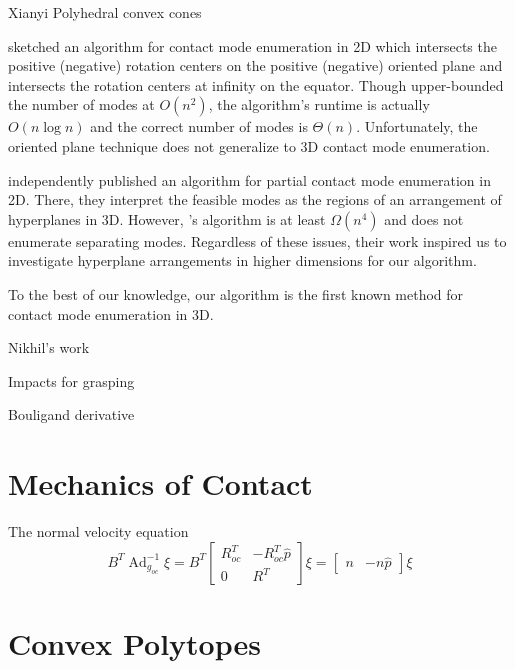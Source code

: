 \documentclass[conference]{IEEEtran}
\DeclareMathOperator{\adjoint}{Ad}
\newcommand{\TODO}[1]{{\color{red} {{#1}}  }}
\begin{document}
\begin{inparaenum}
    \item \TODO{Xianyi} Polyhedral convex cones
    \item \citet{mason_mechanics_2001} sketched an algorithm for contact mode
    enumeration in 2D which intersects the positive (negative) rotation centers
    on the positive (negative) oriented plane and intersects the rotation
    centers at infinity on the equator. Though \citet{mason_mechanics_2001}
    upper-bounded the number of modes at $O(n^2)$, the algorithm's runtime is
    actually $O(n\log n)$ and the correct number of modes is $\Theta(n)$.
    Unfortunately, the oriented plane technique does not generalize to 3D
    contact mode enumeration.
    \item \citet{haas-heger_passive_2018} independently published an algorithm
    for partial contact mode enumeration in 2D. There, they interpret the
    feasible modes as the regions of an arrangement of hyperplanes in 3D.
    However, \citet{haas-heger_passive_2018}'s algorithm is at least
    $\Omega(n^4)$ and does not enumerate separating modes. Regardless of these
    issues, their work inspired us to investigate hyperplane arrangements in
    higher dimensions for our algorithm.
    \item To the best of our knowledge, our algorithm is the first known method
    for contact mode enumeration in 3D.
    \item Nikhil's work
    \item Impacts for grasping
    \item Bouligand derivative
\end{inparaenum}

\section{Mechanics of Contact}

\TODO{}

The normal velocity equation
\begin{equation}
B^T\adjoint_{g_{oc}}^{-1}\xi = 
B^T \begin{bmatrix}
        R_{oc}^T & -R_{oc}^T\widehat{p}\\
        0 & R^T
    \end{bmatrix}\xi = 
\begin{bmatrix} n & -n\widehat{p} \end{bmatrix}\xi
\end{equation}

\section{Convex Polytopes}
\end{document}
